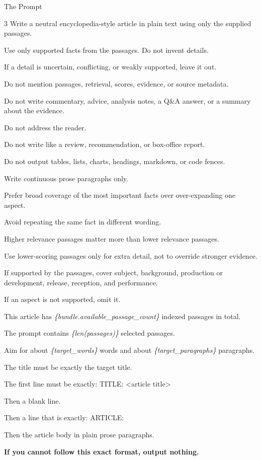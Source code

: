 \documentclass[aspectratio=169,12pt]{beamer}
\begin{document}
\begin{frame}[t]{The Prompt}
\vspace{-0.50cm}

{\color{wine}\ttfamily\scriptsize\RaggedRight\sloppy
\begin{multicols}{3}
Write a neutral encyclopedia-style article in plain text using only the supplied passages.\par
Use only supported facts from the passages. Do not invent details.\par
If a detail is uncertain, conflicting, or weakly supported, leave it out.\par
Do not mention passages, retrieval, scores, evidence, or source metadata.\par
Do not write commentary, advice, analysis notes, a Q\&A answer, or a summary about the evidence.\par
Do not address the reader.\par
Do not write like a review, recommendation, or box-office report.\par
Do not output tables, lists, charts, headings, markdown, or code fences.\par
Write continuous prose paragraphs only.\par
Prefer broad coverage of the most important facts over over-expanding one aspect.\par
Avoid repeating the same fact in different wording.\par
Higher relevance passages matter more than lower relevance passages.\par
Use lower-scoring passages only for extra detail, not to override stronger evidence.\par
If supported by the passages, cover subject, background, production or development, release, reception, and performance.\par
If an aspect is not supported, omit it.\par
This article has \textit{\color{black}\{bundle.available\_passage\_count\}} indexed passages in total.\par
The prompt contains \textit{\color{black}\{len(passages)\}} selected passages.\par
Aim for about \textit{\color{black}\{target\_words\}} words and about \textit{\color{black}\{target\_paragraphs\}} paragraphs.\par
The title must be exactly the target title.\par
The first line must be exactly: TITLE: <article title>\par
Then a blank line.\par
Then a line that is exactly: ARTICLE:\par
Then the article body in plain prose paragraphs.\par
\small\textbf{If you cannot follow this exact format, output nothing.}
\end{multicols}
}
\end{frame}
\end{document}
